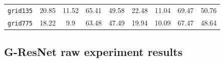 \begin{table}[htb]
\begin{adjustwidth}{-.5in}{-.5in}
\begin{center}
\begin{tabular}{|c|cccc|cccc|}
                \texttt{grid135} &
                20.85 & 11.52 & 65.41 & 49.58 &  %
                22.48 & 11.04 & 69.47 & 50.76   %
                \\
                \texttt{grid775} &
                18.22 & 9.9 & 63.48 & 47.49  %
                & 19.94 & 10.09 & 67.47 & 48.64   %
                \\
                \hline
            \end{tabular}
        \end{center}
    \end{adjustwidth}
\end{table}

\subsection{G-ResNet raw experiment results}
